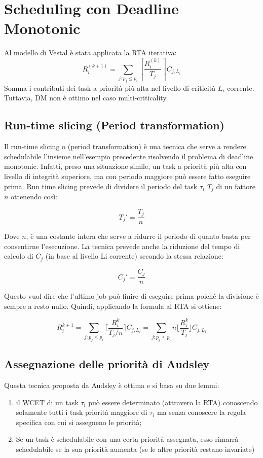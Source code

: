 \documentclass[11pt,a4paper]{report}
\begin{document}
\section{Scheduling con Deadline Monotonic}

Al modello di Vestal è stata applicata la RTA iterativa:
\[ R_i^{(k+1)} = \sum_{j:p_j \le p_i} \left\lceil \frac{R_i^{(k)}}{T_j} \right\rceil C_{j, L_i} \]
Somma i contributi dei task a priorità più alta nel livello di criticità $L_i$ corrente. Tuttavia, DM non è ottimo nel caso multi-criticality.

\subsection{Run-time slicing (Period transformation)}
Il run-time slicing o (period transformation) è una tecnica che serve a rendere schedulabile l'insieme nell'esempio
precedente risolvendo il problema di deadline monotonic. Infatti, preso una situazione simile, un task a priorità più alta con livello di integrità superiore, ma con periodo maggiore può essere fatto eseguire prima.
Run time slicing prevede di dividere il periodo del task $\tau_i$ $T_j$ di un fattore $n$ ottenendo così:

\[T_j'=\frac{T_j}{n}\]

Dove $n$, è una costante intera che serve a ridurre il periodo di quanto basta per consentirne l'esecuzione. La tecnica
prevede anche la riduzione del tempo di calcolo di $C_j$ (in base al livello Li corrente) secondo la stessa relazione:

\[C_j'=\frac{C_j}{n}\]

Questo vuol dire che l'ultimo job può finire di eseguire prima poiché la divisione è sempre a resto nullo. Quindi,
applicando la formula al RTA si ottiene:

\[ R_i^{k+1} = \sum_{j:p_j\leq p_i}\lceil\frac{R_i^k}{T_j/n}\rceil C_{j,L_i} = \sum_{j:p_j\leq p_i}n\lfloor\frac{R_i^k}{T_j}\rfloor C_{j,L_i}\]

\subsection{Assegnazione delle priorità di Audsley}
Questa tecnica proposta da Audsley è ottima e si basa su due lemmi:

\begin{enumerate}
    \item  il WCET di un task $\tau_i$ può essere determinato (attravero la RTA) conoscendo solamente tutti i task priorità maggiore di $\tau_i$ ma senza conoscere la regola specifica con cui si assegneno le priorità;
    \item Se un task è schedulabile con una certa priorità assegnata, esso rimarrà schedulabile se la sua priorità aumenta (se le altre priorità restano invariate)
\end{enumerate}
\end{document}
